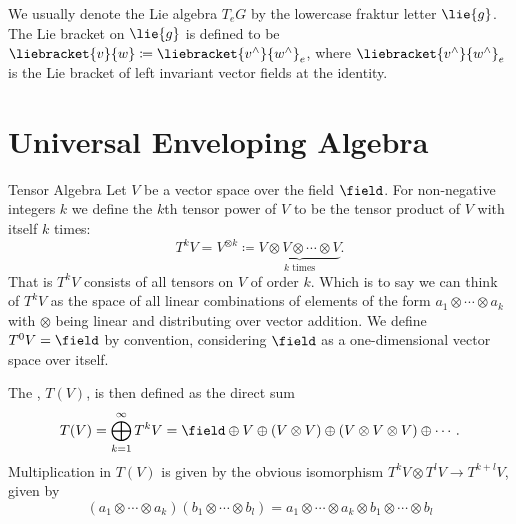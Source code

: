 We usually denote the Lie algebra \(T_eG\) by the lowercase fraktur letter \(\lie{g}\).
The Lie bracket on \(\lie{g}\) is defined to be \(\liebracket{v}{w} \coloneqq \liebracket{v^{\wedge}}{w^{\wedge}}_e\), where \(\liebracket{v^{\wedge}}{w^{\wedge}}_e\) is the Lie bracket of left invariant vector fields at the identity.

\section{Universal Enveloping Algebra}
\begin{dfn}{Tensor Algebra}{}
    Let \(V\) be a vector space over the field \(\field\).
    For non-negative integers \(k\) we define the \(k\)th tensor power of \(V\) to be the tensor product of \(V\) with itself \(k\) times:
    \begin{equation}
        T^kV = V^{\otimes k} \coloneqq \underbrace{V \otimes V \otimes \dotsb \otimes V}_{k \text{ times}}.
    \end{equation}
    That is \(T^kV\) consists of all tensors on \(V\) of order \(k\).
    Which is to say we can think of \(T^kV\) as the space of all linear combinations of elements of the form \(a_1 \otimes \dotsb \otimes a_k\) with \(\otimes\) being linear and distributing over vector addition.
    We define \(T^0V = \field\) by convention, considering \(\field\) as a one-dimensional vector space over itself.
    
    The , \(T(V)\), is then defined as the direct sum
    \begin{equation}
        T(V) = \bigoplus_{k = 1}^{\infty} T^kV = \field \oplus V \oplus (V \otimes V) \oplus (V \otimes V \otimes V) \oplus \dotsb.
    \end{equation}
    Multiplication in \(T(V)\) is given by the obvious isomorphism \(T^kV \otimes T^lV \to T^{k+l}V\), given by
    \begin{equation}
        (a_1 \otimes \dotsb \otimes a_k) (b_1 \otimes \dotsb \otimes b_l) = a_1\otimes \dotsb \otimes a_k \otimes b_1 \otimes \dotsb \otimes b_l
    \end{equation}
\end{dfn}

